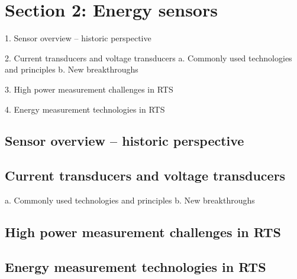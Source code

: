 


\section{Section 2: Energy sensors}

1.	Sensor overview – historic perspective

2.	Current transducers and voltage transducers
a.	Commonly used technologies and principles
b.	New breakthroughs

3.	High power measurement challenges in RTS

4.	Energy measurement technologies in RTS 


\subsection{Sensor overview – historic perspective}

\subsection{Current transducers and voltage transducers}
	
a.	Commonly used technologies and principles
b.	New breakthroughs

\subsection{High power measurement challenges in RTS}	

\subsection{Energy measurement technologies in RTS }